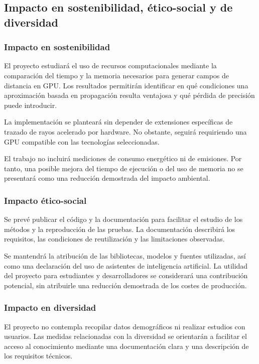 \subsection{Impacto en sostenibilidad, ético-social y de diversidad}

\subsubsection{Impacto en sostenibilidad}

El proyecto estudiará el uso de recursos computacionales mediante la comparación del tiempo y la memoria necesarios para generar campos de distancia en GPU. Los resultados permitirán identificar en qué condiciones una aproximación basada en propagación resulta ventajosa y qué pérdida de precisión puede introducir.

La implementación se planteará sin depender de extensiones específicas de trazado de rayos acelerado por hardware. No obstante, seguirá requiriendo una GPU compatible con las tecnologías seleccionadas.

El trabajo no incluirá mediciones de consumo energético ni de emisiones. Por tanto, una posible mejora del tiempo de ejecución o del uso de memoria no se presentará como una reducción demostrada del impacto ambiental.

\subsubsection{Impacto ético-social}

Se prevé publicar el código y la documentación para facilitar el estudio de los métodos y la reproducción de las pruebas. La documentación describirá los requisitos, las condiciones de reutilización y las limitaciones observadas.

Se mantendrá la atribución de las bibliotecas, modelos y fuentes utilizadas, así como una declaración del uso de asistentes de inteligencia artificial. La utilidad del proyecto para estudiantes y desarrolladores se considerará una contribución potencial, sin atribuirle una reducción demostrada de los costes de producción.

\subsubsection{Impacto en diversidad}

El proyecto no contempla recopilar datos demográficos ni realizar estudios con usuarios. Las medidas relacionadas con la diversidad se orientarán a facilitar el acceso al conocimiento mediante una documentación clara y una descripción de los requisitos técnicos.

